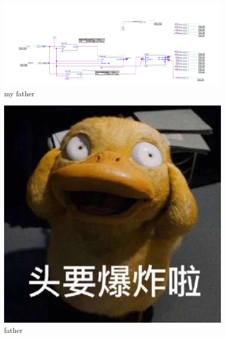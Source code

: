 \documentclass[a4paper,11pt]{article}
\begin{document}
\begin{figure}[H]
    \centering
    \includegraphics[scale = 0.6 ]{1-1.png}
    \caption{my father}
    \label{img} %
\end{figure}
\begin{figure}[H]
    \begin{minipage}[t]{0.45\linewidth}
        \centering
        \includegraphics[scale = 0.1]{1-1.jpg}
        \caption{father}
    \end{minipage}
        \hfill
    \begin{minipage}[t]{0.5\linewidth}
        \centering

\end{minipage}
\end{figure}
\end{document}
